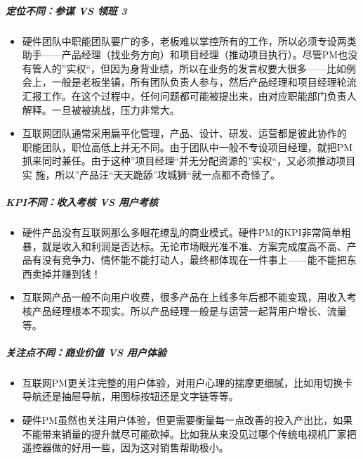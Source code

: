 \documentclass[letterpaper,11pt,english]{sphinxmanual}
\begin{document}
\subparagraph{定位不同：参谋 VS 领班 3\sphinxfootnotemark[268]}
\label{\detokenize{chapter_project/AI_hardware:vs-3}}%
\begin{footnotetext}[268]\sphinxAtStartFootnote
{}
%
\end{footnotetext}\ignorespaces \begin{itemize}
\item {} 
硬件团队中职能团队要广的多，老板难以掌控所有的工作，所以必须专设两类助手——产品经理（找业务方向）和项目经理（推动项目执行）。尽管PM也没有管人的”实权“，但因为身背业绩，所以在业务的发言权要大很多——比如例会上，一般是老板坐镇，所有团队负责人参与，然后产品经理和项目经理轮流汇报工作。在这个过程中，任何问题都可能被提出来，由对应职能部门负责人解释。一旦被被挑战，压力非常大。

\item {} 
互联网团队通常采用扁平化管理，产品、设计、研发、运营都是彼此协作的
职能团队，职位高低上并无不同。由于团队中一般不专设项目经理，就把PM抓来同时兼任。由于这种”项目经理“并无分配资源的”实权“，又必须推动项目实
施，所以”产品汪“天天跪舔”攻城狮“就一点都不奇怪了。

\end{itemize}


\subparagraph{KPI不同：收入考核 VS 用户考核}
\label{\detokenize{chapter_project/AI_hardware:kpi-vs}}\begin{itemize}
\item {} 
硬件产品没有互联网那么多眼花缭乱的商业模式。硬件PM的KPI非常简单粗暴，就是收入和利润是否达标。无论市场眼光准不准、方案完成度高不高、产品有没有竞争力、情怀能不能打动人，最终都体现在一件事上——能不能把东西卖掉并赚到钱！

\item {} 
互联网产品一般不向用户收费，很多产品在上线多年后都不能变现，用收入考核产品经理根本不现实。所以产品经理一般是与运营一起背用户增长、流量等。

\end{itemize}


\subparagraph{关注点不同：商业价值 VS 用户体验}
\label{\detokenize{chapter_project/AI_hardware:vs}}\begin{itemize}
\item {} 
互联网PM更关注完整的用户体验，对用户心理的揣摩更细腻，比如用切换卡导航还是抽屉导航，用图标按钮还是文字链等等。

\item {} 
硬件PM虽然也关注用户体验，但更需要衡量每一点改善的投入产出比，如果不能带来销量的提升就尽可能砍掉。比如我从来没见过哪个传统电视机厂家把遥控器做的好用一些，因为这对销售帮助极小。

\end{itemize}
\end{document}
